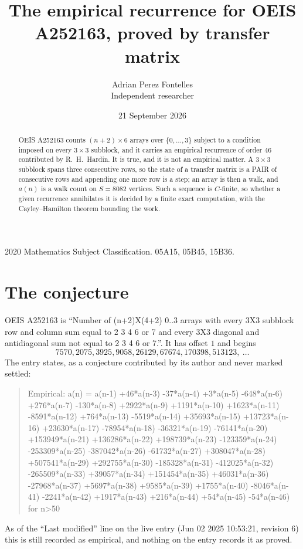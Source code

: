 \documentclass[11pt,a4paper]{article}
\title{The empirical recurrence for OEIS A252163, proved by transfer matrix}
\author{Adrian Perez Fontelles\\ \small Independent researcher}
\date{21 September 2026}
\theoremstyle{plain}
\theoremstyle{definition}
\begin{document}
\maketitle

\begin{abstract}
OEIS A252163 counts $(n+2)\times6$ arrays over $\{0,\dots,3\}$ subject to a condition imposed on
every $3\times3$ subblock, and it carries an empirical recurrence of order $46$
contributed by R.~H.~Hardin. It is true, and it is not an empirical matter. A $3\times3$
subblock spans three consecutive rows, so the state of a transfer matrix is a PAIR of
consecutive rows and appending one more row is a step; an array is then a walk, and
$a(n)$ is a walk count on $S=8082$ vertices. Such a sequence is $C$-finite, so whether a given
recurrence annihilates it is decided by a finite exact computation, with the Cayley--Hamilton
theorem bounding the work.
\end{abstract}

\noindent\small 2020 Mathematics Subject Classification. 05A15, 05B45, 15B36.\normalsize

\section{The conjecture}

OEIS A252163 is ``Number of (n+2)X(4+2) 0..3 arrays with every 3X3 subblock row and column sum equal to 2 3 4 6 or 7 and every 3X3 diagonal and antidiagonal sum not equal to 2 3 4 6 or 7.''. It has offset $1$ and begins
\[
7570, 2075, 3925, 9058, 26129, 67674, 170398, 513123,\ \dots
\]
The entry states, as a conjecture contributed by its author and never marked settled:
\begin{quote}
Empirical: a(n) = a(n-1) +46*a(n-3) -37*a(n-4) +3*a(n-5) -648*a(n-6) +276*a(n-7) -130*a(n-8) +2922*a(n-9) +1191*a(n-10) +1623*a(n-11) -8591*a(n-12) +764*a(n-13) -5519*a(n-14) +35693*a(n-15) +13723*a(n-16) +23630*a(n-17) -78954*a(n-18) -36321*a(n-19) -76141*a(n-20) +153949*a(n-21) +136286*a(n-22) +198739*a(n-23) -123359*a(n-24) -253309*a(n-25) -387042*a(n-26) -61732*a(n-27) +308047*a(n-28) +507541*a(n-29) +292755*a(n-30) -185328*a(n-31) -412025*a(n-32) -265509*a(n-33) +39057*a(n-34) +151454*a(n-35) +46031*a(n-36) -27968*a(n-37) +5697*a(n-38) +9585*a(n-39) +1755*a(n-40) -8046*a(n-41) -2241*a(n-42) +1917*a(n-43) +216*a(n-44) +54*a(n-45) -54*a(n-46) for n>50
\end{quote}
As of the ``Last modified'' line on the live entry (Jun 02 2025 10:53:21, revision 6) this is still
recorded as empirical, and nothing on the entry records it as proved.
\end{document}
